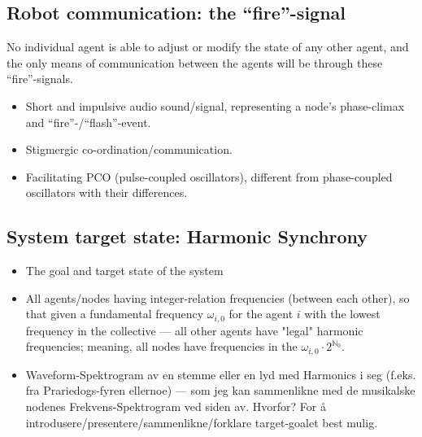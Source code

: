 	\subsection{Robot communication: the ``fire''-signal}
	\label{subsec:fire_signal}
	
	No individual agent is able to adjust or modify the state of any other agent, and the only means of communication between the agents will be through these ``fire''-signals.
	
		\begin{itemize}
			\item Short and impulsive audio sound/signal, representing a node's phase-climax and ``fire''-/``flash''-event.
			\item Stigmergic co-ordination/communication.
			\item Facilitating PCO (pulse-coupled oscillators), different from phase-coupled oscillators with their differences.
		\end{itemize}

	

	\subsection{System target state: Harmonic Synchrony}
	\label{subsec:harmonic_synchrony}
		\begin{itemize}
			\item The goal and target state of the system
			\item All agents/nodes having integer-relation frequencies (between each other), so that given a fundamental frequency $\omega_{i,0}$ for the agent $i$ with the lowest frequency in the collective — all other agents have "legal" harmonic frequencies; meaning, all nodes have frequencies in the  $\omega_{i,0} \cdot 2^{\mathbb{N}_0}$.
			\item Waveform-Spektrogram av en stemme eller en lyd med Harmonics i seg (f.eks. fra Prariedogs-fyren ellernoe) — som jeg kan sammenlikne med de musikalske nodenes Frekvens-Spektrogram ved siden av. Hvorfor? For å introdusere/presentere/sammenlikne/forklare target-goalet best mulig.
		\end{itemize}
	
	
	
	
	
	
	
